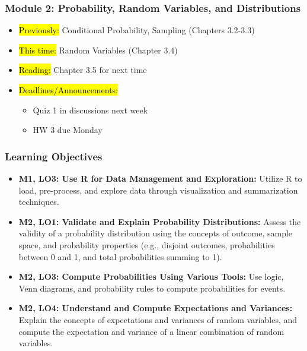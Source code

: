 
\begin{frame}
    \frametitle{Module 2: Probability, Random Variables, and Distributions}
    \begin{itemize}
        \item \hl{Previously: } Conditional Probability, Sampling (Chapters 3.2-3.3)
        \item \hl{This time: } Random Variables (Chapter 3.4)
        \item \hl{Reading: } Chapter 3.5 for next time
        \item \hl{Deadlines/Announcements: } 
        \begin{itemize}
            \item Quiz 1 in discussions next week
            \item HW 3 due Monday
        \end{itemize}
    \end{itemize}
    
\end{frame}

\begin{frame}
    \frametitle{Learning Objectives}
    \begin{itemize}
        \item \textbf{M1, LO3: Use R for Data Management and Exploration:} Utilize R to load, pre-process, and explore data through visualization and summarization techniques.
        \item \textbf{M2, LO1: Validate and Explain Probability Distributions:} Assess the validity of a probability distribution using the concepts of outcome, sample space, and probability properties (e.g., disjoint outcomes, probabilities between 0 and 1, and total probabilities summing to 1).
        \item \textbf{M2, LO3: Compute Probabilities Using Various Tools:} Use logic, Venn diagrams, and probability rules to compute probabilities for events.
        \item \textbf{M2, LO4: Understand and Compute Expectations and Variances:} Explain the concepts of expectations and variances of random variables, and compute the expectation and variance of a linear combination of random variables.
    \end{itemize}
\end{frame}
